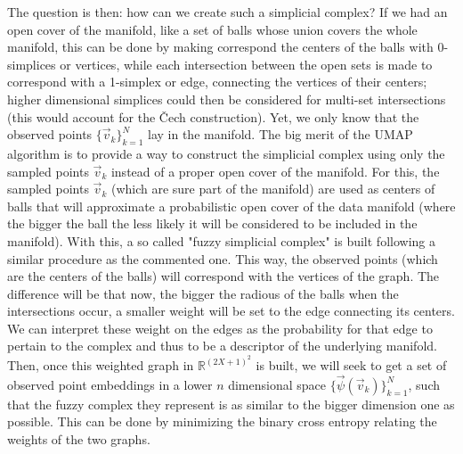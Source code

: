 \documentclass[11pt, a4paper, twoside]{article} %
\newcommand{\R}{\mathbb{R}} %
\DeclareRobustCommand{\mybox}[2][gray!10]{%
\begin{tcolorbox}[   %
        left=0.2cm,
        right=0.2cm,
        top=0.15cm,
        bottom=0.15cm,
        colback=#1,
        colframe=#1,
        width=\dimexpr\textwidth\relax, 
        enlarge left by=0mm,
        boxsep=5pt,
        arc=0pt,outer arc=0pt,
        ]
        #2
\end{tcolorbox}
}
\begin{document}
\mybox{The question is then: how can we create such a simplicial complex? If we had an open cover of the manifold, like a set of balls whose union covers the whole manifold, this can be done by making correspond the centers of the balls with 0-simplices or vertices, while each intersection between the open sets is made to correspond with a 1-simplex or edge, connecting the vertices of their centers; higher dimensional simplices could then be considered for multi-set intersections (this would account for the Čech construction). Yet, we only know that the observed points $\{\vec{v}_k\}_{k=1}^N$ lay in the manifold. The big merit of the UMAP algorithm \cite{umap} is to provide a way to construct the simplicial complex using only the sampled points $\vec{v}_k$ instead of a proper open cover of the manifold. For this, the sampled points $\vec{v}_k$ (which are sure part of the manifold) are used as centers of balls that will approximate a probabilistic open cover of the data manifold (where the bigger the ball the less likely it will be considered to be included in the manifold). With this, a so called "fuzzy simplicial complex" is built following a similar procedure as the commented one. This way, the observed points (which are the centers of the balls) will correspond with the vertices of the graph. The difference will be that now, the bigger the radious of the balls when the intersections occur, a smaller weight will be set to the edge connecting its centers. We can interpret these weight on the edges as the probability for that edge to pertain to the complex and thus to be a descriptor of the underlying manifold. Then, once this weighted graph in $\R^{(2X+1)^2}$ is built, we will seek to get a set of observed point embeddings in a lower $n$ dimensional space $\{\vec{\psi}(\vec{v}_k)\}_{k=1}^N$, such that the fuzzy complex they represent is as similar to the bigger dimension one as possible. This can be done by minimizing the binary cross entropy relating the weights of the two graphs.\vspace{0.2cm}

}
\end{document}
